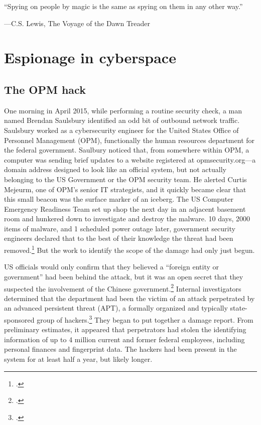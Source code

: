\documentclass{memoir}
\begin{document}
\begin{refsegment}
\epigraph{``Spying on people by magic is the same as spying on them in any other way.''}{---\textup{C.S. Lewis}, The Voyage of the Dawn Treader}

\section{Espionage in cyberspace}
\subsection{The OPM hack}
One morning in April 2015, while performing a routine security check, a man named Brendan Saulsbury identified an odd bit of outbound network traffic. Saulsbury worked as a cybersecurity engineer for the United States Office of Personnel Management (OPM), functionally the human resources department for the federal government. Saulbury noticed that, from somewhere within OPM, a computer was sending brief updates to a website registered at opmsecurity.org---a domain address designed to look like an official system, but not actually belonging to the US Government or the OPM security team. He alerted Curtis Mejeurm, one of OPM's senior IT strategists, and it quickly became clear that this small beacon was the surface marker of an iceberg. The US Computer Emergency Readiness Team set up shop the next day in an adjacent basement room and hunkered down to investigate and destroy the malware. 10 days, 2000 items of malware, and 1 scheduled power outage later, government security engineers declared that to the best of their knowledge the threat had been removed.\footcite{koerner_inside_2016} But the work to identify the scope of the damage had only just begun.

US officials would only confirm that they believed a ``foreign entity or government'' had been behind the attack, but it was an open secret that they suspected the involvement of the Chinese government.\footcite{spetalnick_china_2015} Internal investigators determined that the department had been the victim of an attack perpetrated by an advanced persistent threat (APT), a formally organized and typically state-sponsored group of hackers.\footcite[Attributing a cyberattack is difficult because hackers have endless means to obscure their orgins. In this case, however, the first clue that investigators found was left there on purpose. A particularly effective group of hackers tied to China has made it a calling card of sorts to register sites using the names of members of Marvel's comic book superhero group, The Avengers. In this case, opmsecurity.org was registered under the name ``Steve Rogers,'' better known as Captain America.]{koerner_inside_2016} They began to put together a damage report. From preliminary estimates, it appeared that perpetrators had stolen the identifying information of up to 4 million current and former federal employees, including personal finances and fingerprint data. The hackers had been present in the system for at least half a year, but likely longer.


\end{refsegment}
\end{document}
